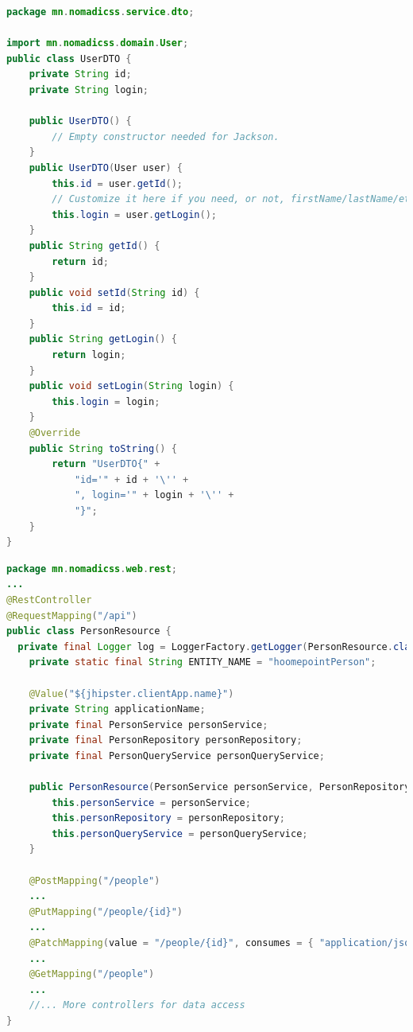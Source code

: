 \begin{lstlisting}[language=Java, caption=UserDTO.java, frame=single]
package mn.nomadicss.service.dto;

import mn.nomadicss.domain.User;
public class UserDTO {
    private String id;
    private String login;

    public UserDTO() {
        // Empty constructor needed for Jackson.
    }
    public UserDTO(User user) {
        this.id = user.getId();
        // Customize it here if you need, or not, firstName/lastName/etc
        this.login = user.getLogin();
    }
    public String getId() {
        return id;
    }
    public void setId(String id) {
        this.id = id;
    }
    public String getLogin() {
        return login;
    }
    public void setLogin(String login) {
        this.login = login;
    }
    @Override
    public String toString() {
        return "UserDTO{" +
            "id='" + id + '\'' +
            ", login='" + login + '\'' +
            "}";
    }
}

\end{lstlisting}
\pagebreak
\begin{lstlisting}[language=Java, caption=UserDTO.java, frame=single]
package mn.nomadicss.web.rest;
...
@RestController
@RequestMapping("/api")
public class PersonResource {
  private final Logger log = LoggerFactory.getLogger(PersonResource.class);
    private static final String ENTITY_NAME = "hoomepointPerson";

    @Value("${jhipster.clientApp.name}")
    private String applicationName;
    private final PersonService personService;
    private final PersonRepository personRepository;
    private final PersonQueryService personQueryService;

    public PersonResource(PersonService personService, PersonRepository personRepository, PersonQueryService personQueryService) {
        this.personService = personService;
        this.personRepository = personRepository;
        this.personQueryService = personQueryService;
    }

    @PostMapping("/people")
    ...
    @PutMapping("/people/{id}")
    ...
    @PatchMapping(value = "/people/{id}", consumes = { "application/json", "application/merge-patch+json" })
    ...
    @GetMapping("/people")
    ...
    //... More controllers for data access
}
\end{lstlisting}
\pagebreak
